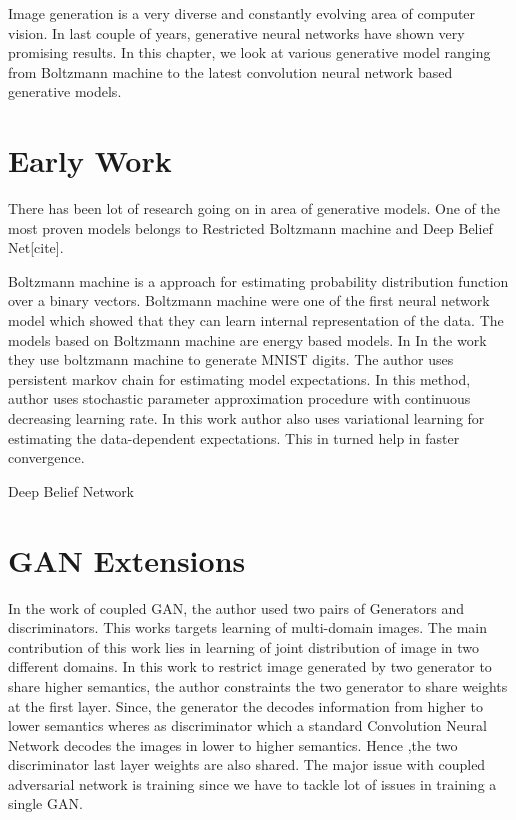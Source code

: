 
\doublespacing


Image generation is a very diverse and constantly evolving area of computer vision. In last couple of years, generative neural networks have shown very promising results. In this chapter, we look at various generative model ranging from Boltzmann machine to the latest convolution neural network based generative models.
\section{Early Work}

There has been lot of research going on in area of generative models. One of the most proven models belongs to Restricted Boltzmann machine and Deep Belief Net[cite].

Boltzmann machine is a approach for estimating probability distribution function over a binary vectors. Boltzmann machine were one of the first neural network model which showed that they can learn internal representation of the data\cite{Boltzman-Wiki}. The models based on Boltzmann machine are energy based models. In 
In the work they use boltzmann machine to generate MNIST digits. The author uses persistent markov chain for estimating model expectations. In this method, author uses stochastic parameter approximation procedure with continuous decreasing learning rate. In this work author also uses variational learning for estimating the data-dependent expectations. This in turned help in faster convergence.

\par 

Deep Belief Network


\section{GAN Extensions}
In the work of coupled GAN\cite{Co-GAN}, the author used two pairs of Generators and discriminators. This works targets learning of multi-domain images. The main contribution of this work lies in learning of joint distribution of image in two different domains. In this work to restrict image generated by two generator to share higher semantics, the author constraints the two generator to share weights at the first layer. Since, the generator the decodes information from higher to lower semantics wheres as discriminator which a standard Convolution Neural Network decodes the images in lower to higher semantics. Hence ,the two discriminator last layer weights are also shared. The major issue with coupled adversarial network is training since we have to tackle lot of issues in training a single GAN.
\par

